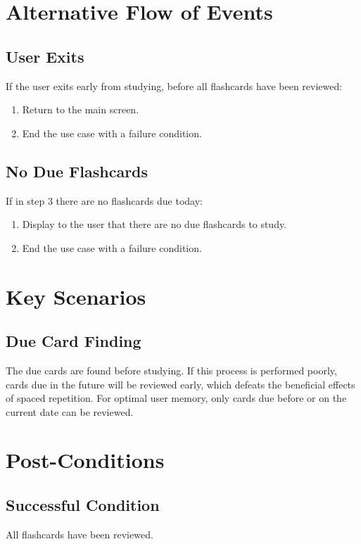 \documentclass{scrreprt}
\begin{document}
\section{Alternative Flow of Events}
    \subsection{User Exits}
    If the user exits early from studying, before all flashcards have been reviewed:
    \begin{enumerate}[1.]
        \item Return to the main screen.
        \item End the use case with a failure condition.
    \end{enumerate}
    
    \subsection{No Due Flashcards}
    If in step 3 there are no flashcards due today:
    \begin{enumerate}[1.]
        \item Display to the user that there are no due flashcards to study.
        \item End the use case with a failure condition.
    \end{enumerate}

\section{Key Scenarios}
    \subsection{Due Card Finding}
    The due cards are found before studying.
    If this process is performed poorly, cards due in the future will be reviewed early,
    which defeats the beneficial effects of spaced repetition.
    For optimal user memory, only cards due before or on the current date can be reviewed.

\section{Post-Conditions}
    \subsection{Successful Condition}
    All flashcards have been reviewed.
    
\end{document}
